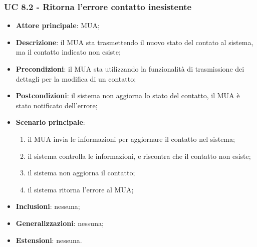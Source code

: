 \subsubsection{UC 8.2 - Ritorna l'errore contatto inesistente} \label{sec:UC8.2}
    \begin{itemize}
        \item \textbf{Attore principale}: MUA;
        \item \textbf{Descrizione}: il MUA sta trasmettendo il nuovo stato del contato al sistema, ma il contatto indicato non esiste;
        \item \textbf{Precondizioni}: il MUA sta utilizzando la funzionalità di trasmissione dei dettagli per la modifica di un contatto;
        \item \textbf{Postcondizioni}: il sistema non aggiorna lo stato del contatto, il MUA è stato notificato dell'errore;
        \item \textbf{Scenario principale}:
            \begin{enumerate}
                \item il MUA invia le informazioni per aggiornare il contatto nel sistema;
                \item il sistema controlla le informazioni, e riscontra che il contatto non esiste;
                \item il sistema non aggiorna il contatto;
                \item il sistema ritorna l'errore al MUA;
            \end{enumerate}
        \item \textbf{Inclusioni}: nessuna;
        \item \textbf{Generalizzazioni}: nessuna;
        \item \textbf{Estensioni}: nessuna.
    \end{itemize}

